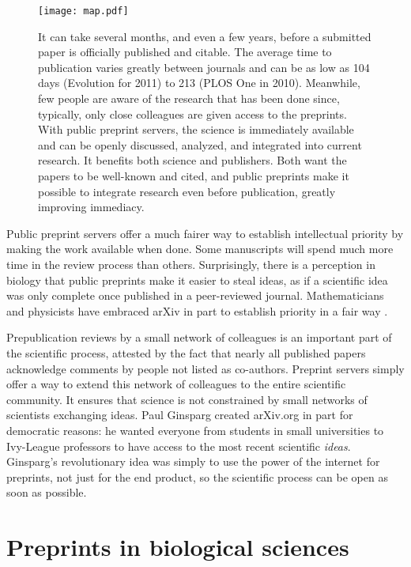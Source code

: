 \documentclass[letterpaper,twocolumn,superscriptaddress,showkeys]{revtex4}
\begin{document}
\begin{figure}[ht!] \centering\texttt{[image: map.pdf]}
\caption { It can take several months, and even a few years, before a submitted
paper is officially published and citable.  The average time to publication
varies greatly between journals and can be as low as 104 days (Evolution for
2011) to 213 (PLOS One in 2010).  Meanwhile, few people are aware of the
research that has been done since, typically, only close colleagues are given
access to the preprints. With public preprint servers, the science is
immediately available and can be openly discussed, analyzed, and integrated into
current research. It benefits both science and publishers. Both want the papers
to be well-known and cited, and public preprints make it possible to integrate
research even before publication, greatly improving immediacy.  }
\label{fig:map} \end{figure}

Public preprint servers offer a much fairer way to establish
intellectual priority by making the work available when done. Some
manuscripts will spend much more time in the review process than
others. Surprisingly, there is a perception in biology that public
preprints make it easier to steal ideas, as if a scientific idea was
only complete once published in a peer-reviewed journal.
Mathematicians and physicists have embraced arXiv in part to establish
priority in a fair way \cite{cal12}.

Prepublication reviews by a small network of colleagues is an
important part of the scientific process, attested by the fact that
nearly all published papers acknowledge comments by people not listed
as co-authors.  Preprint servers simply offer a way to extend this
network of colleagues to the entire scientific community. It ensures
that science is not constrained by small networks of scientists
exchanging ideas.  Paul Ginsparg created arXiv.org in part for
democratic reasons: he wanted everyone from students in small
universities to Ivy-League professors to have access to the most
recent scientific \emph{ideas}.  Ginsparg's revolutionary idea was
simply to use the power of the internet for preprints, not just for
the end product, so the scientific process can be open as soon as
possible.

\section{Preprints in biological sciences}
\end{document}
